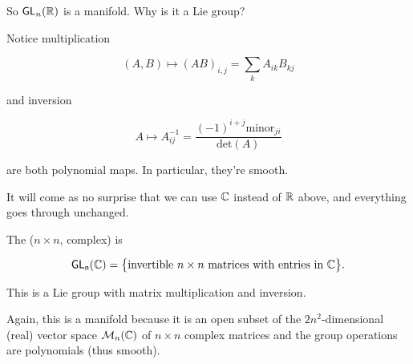\documentclass[../main.tex]{subfiles}
\begin{document}
So $\mathsf{GL}_n(\mathbb{R})$ is a manifold. Why is it a Lie group?

Notice multiplication

\[
  (A,B) \mapsto (AB)_{i,j} = \sum_k A_{ik} B_{kj}
\]

and inversion

\[
  A \mapsto A^{-1}_{ij} = \frac{(-1)^{i+j} \text{minor}_{ji}}{\text{det}(A)}
\]

are both polynomial maps. In particular, they're smooth.



\bigskip

It will come as no surprise that we can use $\mathbb{C}$ instead of $\mathbb{R}$ above, and
everything goes through unchanged.

\begin{defn}
  The ($n \times n$, complex)  is

  \[
    \mathsf{GL_n}(\mathbb{C}) = \big \{ \text{invertible $n \times n$ matrices with entries in $\mathbb{C}$} \big \}.
  \]

  This is a Lie group with matrix multiplication and inversion.
\end{defn}

Again, this is a manifold because it is an open subset of the $2n^2$-dimensional
(real) vector space $\mathcal{M}_n(\mathbb{C})$ of $n \times n$ complex matrices and
the group operations are polynomials (thus smooth).
\end{document}
